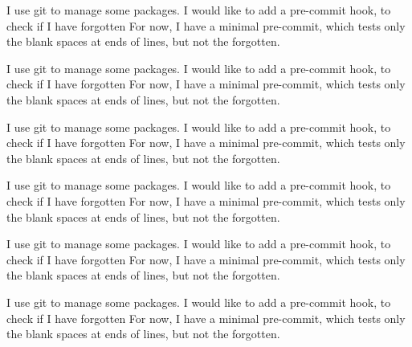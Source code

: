 \documentclass{book}
\begin{document}
\begin{pages}
\begin{Leftside}
\pstart
I use git to manage some packages.
I would like to add a pre-commit hook, to check if I have forgotten
For now, I have a minimal pre-commit, which tests only the blank spaces at ends of lines, but not the forgotten.
\pend

\pstart
{}
\pend

\pstart
I use git to manage some packages.
I would like to add a pre-commit hook, to check if I have forgotten
For now, I have a minimal pre-commit, which tests only the blank spaces at ends of lines, but not the forgotten.
\pend


\endnumbering
\end{Leftside}

\begin{Rightside}

\beginnumbering
\pstart
{}
\pend

\pstart
I use git to manage some packages.
I would like to add a pre-commit hook, to check if I have forgotten
For now, I have a minimal pre-commit, which tests only the blank spaces at ends of lines, but not the forgotten.
\pend

\pstart
{}
\pend

\pstart
{}
\pend

\pstart
{}
\pend

\pstart
I use git to manage some packages.
I would like to add a pre-commit hook, to check if I have forgotten
For now, I have a minimal pre-commit, which tests only the blank spaces at ends of lines, but not the forgotten.
\pend

\pstart
{}
\pend

\pstart
I use git to manage some packages.
I would like to add a pre-commit hook, to check if I have forgotten
For now, I have a minimal pre-commit, which tests only the blank spaces at ends of lines, but not the forgotten.
\pend

\pstart
I use git to manage some packages.
I would like to add a pre-commit hook, to check if I have forgotten
For now, I have a minimal pre-commit, which tests only the blank spaces at ends of lines, but not the forgotten.
\pend

\pstart
{}
\pend

\pstart
{}
\pend


\end{Rightside}
\end{pages}
\end{document}
